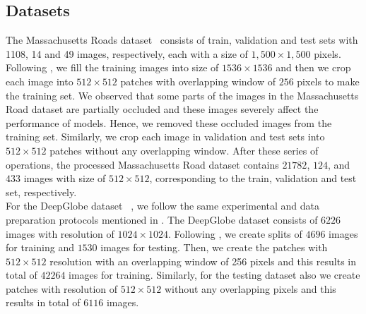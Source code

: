 \documentclass[letterpaper, 10 pt, conference]{ieeeconf}
\begin{document}
\subsection{Datasets}
 The Massachusetts Roads dataset~\cite{mnih2013machine} consists of train, validation and test sets with 1108, 14 and 49 images, respectively, each with a size of $ 1,500 \times 1,500$ pixels. Following \cite{wulamu2019multiscale}, we fill the training images into size of $1536 \times 1536$ and then we crop each image into $512 \times 512$ patches with overlapping window of $256$ pixels to make the training set. We observed that some parts of the images in the Massachusetts Road dataset are partially occluded and these images severely affect the performance of models. Hence, we removed these occluded images from the training set. Similarly, we crop each image in validation and test sets into $512 \times 512$ patches without any overlapping window. After these series of operations, the processed Massachusetts Road dataset contains $21782$, $124$, and $433$ images with size of $512 \times 512$, corresponding to the train, validation and test set, respectively.\\
 For the DeepGlobe dataset ~\cite{demir2018deepglobe}, we follow the same experimental and data preparation protocols mentioned in \cite{batra2019improved}. The DeepGlobe dataset consists  of $6226$ images with resolution of $1024 \times 1024$. Following \cite{batra2019improved}, we create splits of $4696$ images for training and $1530$ images for testing. Then, we create the patches with $512 \times 512$ resolution with an overlapping window of 256 pixels and this results in total of $42264$ images for training. Similarly, for the testing dataset also we create patches with resolution of $512 \times 512$ without any overlapping pixels and this results in total of $6116$ images.\\
\end{document}
